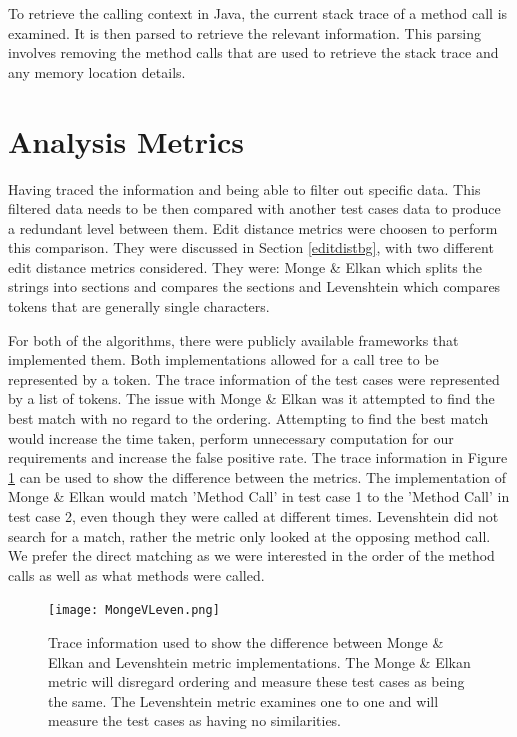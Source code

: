 To retrieve the calling context in Java, the current stack trace of a method call is examined. It is then parsed to retrieve the relevant information. This parsing involves removing the method calls that are used to retrieve the stack trace and any memory location details. 

\section{Analysis Metrics}
\label{S:metrics}
Having traced the information and being able to filter out specific data. This filtered data needs to be then compared with another test cases data to produce a redundant level between them. Edit distance metrics were choosen to perform this comparison. They were discussed in Section \ref{editdistbg}, with two different edit distance metrics considered. They were: Monge \& Elkan \cite{monge1997efficient} which splits the strings into sections and compares the sections and Levenshtein \cite{levenshtein1966binary} which compares tokens that are generally single characters. 

For both of the algorithms, there were publicly available frameworks that implemented them. Both implementations allowed for a call tree to be represented by a token. The trace information of the test cases were represented by a list of tokens. The issue with Monge \& Elkan was it attempted to find the best match with no regard to the ordering. Attempting to find the best match would increase the time taken, perform unnecessary computation for our requirements and increase the false positive rate. The trace information in Figure \ref{fig:mongevleven} can be used to show the difference between the metrics. The implementation of Monge \& Elkan would match 'Method Call' in test case 1 to the 'Method Call' in test case 2, even though they were called at different times. Levenshtein did not search for a match, rather the metric only looked at the opposing method call. We prefer the direct matching as we were interested in the order of the method calls as well as what methods were called.

\begin{figure}[h]
\begin{center}
\texttt{[image: MongeVLeven.png]}
\end{center}
\caption{Trace information used to show the difference between Monge \& Elkan and Levenshtein metric implementations. The Monge \& Elkan metric will disregard ordering and measure these test cases as being the same. The Levenshtein metric examines one to one and will measure the test cases as having no similarities.}
\label{fig:mongevleven}
\end{figure}

